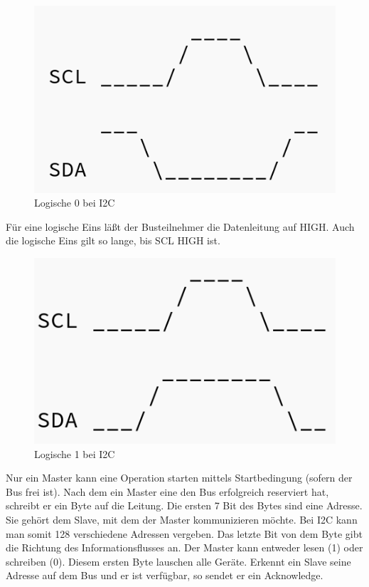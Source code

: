 \begin{figure}[h!] 
\includegraphics[scale=0.3]{bilder/i2c_0}
\caption[Logische 0 bei I2C]{Logische 0 bei \ac{I2C} \cite{cc}}
\label{i2c_0}
\end{figure}


Für eine logische Eins läßt der Busteilnehmer die Datenleitung auf HIGH. Auch die logische Eins gilt so lange, bis SCL HIGH ist. 

\begin{figure}[h!] 
\includegraphics[scale=0.3]{bilder/i2c_1}
\caption[Logische 1 bei I2C]{Logische 1 bei \ac{I2C} \cite{cc}}
\label{i2c_1}
\end{figure}

Nur ein Master kann eine Operation starten mittels Startbedingung (sofern der Bus frei ist). Nach dem ein Master eine den Bus erfolgreich reserviert hat, schreibt er ein Byte auf die Leitung. Die ersten 7 Bit des Bytes sind eine Adresse. Sie gehört dem Slave, mit dem der Master kommunizieren möchte. Bei \ac{I2C}  kann man somit 128 verschiedene Adressen vergeben. Das letzte Bit von dem Byte gibt die Richtung des Informationsflusses an. Der Master kann entweder lesen (1) oder schreiben (0). Diesem ersten Byte lauschen alle Geräte. Erkennt ein Slave seine Adresse auf dem Bus und er ist verfügbar, so sendet er ein Acknowledge.

